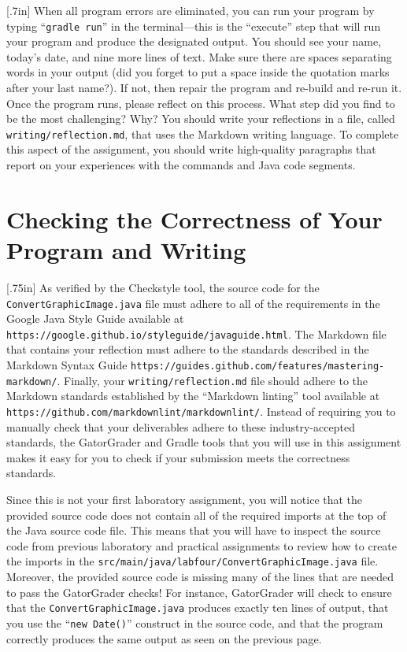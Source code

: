 \documentclass[11pt]{article}
\newcommand{\mainprogram}{\lstinline{ConvertGraphicImage.java}}
\newcommand{\mainprogramsource}{\lstinline{src/main/java/labfour/ConvertGraphicImage.java}}
\newcommand{\reflection}{\lstinline{writing/reflection.md}}
\newcommand{\gradlerun}{\command{gradle run}}
\newcommand{\command}[1]{``\lstinline{#1}''}
\newcommand{\url}[1]{\lstinline{#1}}
\newcommand{\step}[1]{``{#1}''}
\newcommand{\resource}[1]{\null\hfill\LARGE{\faLink{}}\newline\scriptsize{\em{#1}}}
\newcommand{\think}[1]{\null\hfill\LARGE{\faCogs{}}\newline\scriptsize{\em{#1}}}
\begin{document}
\marginnote{\think{Reflect on challenges}}[.7in] When all program errors are
eliminated, you can run your program by typing \gradlerun{} in the
terminal---this is the ``execute'' step that will run your program and produce
the designated output. You should see your name, today's date, and nine more
lines of text. Make sure there are spaces separating words in your output (did
you forget to put a space inside the quotation marks after your last name?). If
not, then repair the program and re-build and re-run it. Once the program runs,
please reflect on this process. What step did you find to be the most
challenging? Why? You should write your reflections in a file, called
\reflection{}, that uses the Markdown writing language. To complete this aspect
of the assignment, you should write high-quality paragraphs that report on your
experiences with the commands and Java code segments.

\section*{Checking the Correctness of Your Program and Writing}

\marginnote{\resource{Study style guides}}[.75in] As verified by the Checkstyle
tool, the source code for the \mainprogram{} file must adhere to all of the
requirements in the Google Java Style Guide available at
\url{https://google.github.io/styleguide/javaguide.html}. The Markdown file that
contains your reflection must adhere to the standards described in the Markdown
Syntax Guide \url{https://guides.github.com/features/mastering-markdown/}.
Finally, your \reflection{} file should adhere to the Markdown standards
established by the \step{Markdown linting} tool available at
\url{https://github.com/markdownlint/markdownlint/}. Instead of requiring you to
manually check that your deliverables adhere to these industry-accepted
standards, the GatorGrader and Gradle tools that you will use in this assignment
makes it easy for you to check if your submission meets the correctness
standards.

Since this is not your first laboratory assignment, you will notice that the
provided source code does not contain all of the required imports at the top of
the Java source code file. This means that you will have to inspect the source
code from previous laboratory and practical assignments to review how to create
the imports in the \mainprogramsource{} file. Moreover, the provided source code
is missing many of the lines that are needed to pass the GatorGrader checks! For
instance, GatorGrader will check to ensure that the \mainprogram{} produces
exactly ten lines of output, that you use the \command{new Date()} construct in
the source code, and that the program correctly produces the same output as seen
on the previous page.
\end{document}
